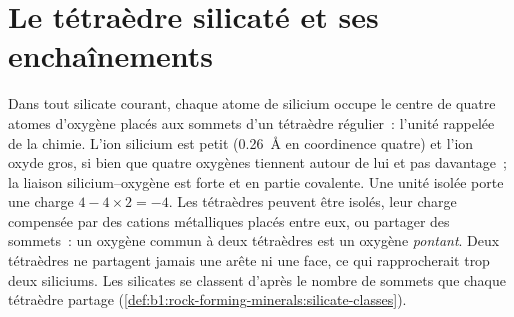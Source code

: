 \section{Le tétraèdre silicaté et ses enchaînements}

Dans tout silicate courant, chaque atome de silicium occupe le centre de quatre
atomes d'oxygène placés aux sommets d'un tétraèdre régulier~: l'unité
 rappelée de la chimie. L'ion silicium est petit
(\qty{0.26}{\angstrom} en coordinence quatre) et l'ion oxyde gros, si bien que
quatre oxygènes tiennent autour de lui et pas davantage~; la liaison
silicium--oxygène est forte et en partie covalente. Une unité isolée porte une
charge $4 - 4\times2 = -4$.
Les tétraèdres peuvent être isolés, leur charge compensée par des cations
métalliques placés entre eux, ou partager des sommets~: un oxygène commun à deux
tétraèdres est un oxygène \emph{pontant}. Deux tétraèdres ne partagent jamais une
arête ni une face, ce qui rapprocherait trop deux siliciums. Les silicates se
classent d'après le nombre de sommets que chaque tétraèdre partage
(\cref{def:b1:rock-forming-minerals:silicate-classes}).

